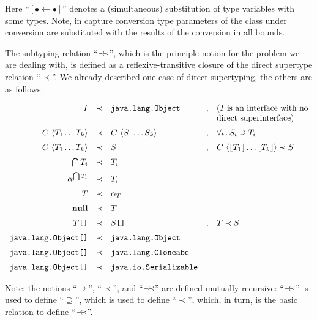 Here ``$[\bullet\gets\bullet]$'' denotes a (simultaneous) substitution of type variables with some types. Note, in capture conversion
type parameters of the class under conversion are substituted with the results of the conversion in all bounds.

The subtyping relation ``$\prec\mathrel{\mkern-5mu}\prec$'', which is the principle notion for the problem we are dealing with, is defined as a reflexive-transitive
closure of the direct supertype relation ``$\prec$''. We already described one case of direct supertyping, the others are as follows:

\[
\begin{array}{rclcl}
  I & \prec & \texttt{java.lang.Object} &,& \mbox{($I$ is an interface with no}\\
    &       &                         & &\mbox{direct superinterface)}\\[2mm]
  {C}\,\left<{T_1\dots T_k}\right> & \prec & {C}\,\left<{S_1\dots S_k}\right> &,& \forall i\, .\, S_i\supseteq T_i\\[2mm]
  {C}\,\left<{T_1\dots T_k}\right> & \prec & S &,& {C}\,\left<{\lfloor{T_1}\rfloor\dots \lfloor{T_k}\rfloor}\right>\prec S\\[2mm]
  \bigcap T_i & \prec & T_i && \\[2mm]
  \alpha^{\bigcap T_i} & \prec & T_i &&\\[2mm]
  T & \prec & \alpha_T && \\[2mm]
  \mathbf{null} & \prec & T &&\\[2mm]
  T\texttt{[]} & \prec & S\texttt{[]} &,& T\prec S\\[2mm]
  \texttt{java.lang.Object[]} & \prec & \texttt{java.lang.Object} &&  \\[2mm]
  \texttt{java.lang.Object[]} & \prec & \texttt{java.lang.Cloneabe} && \\[2mm]
  \texttt{java.lang.Object[]} & \prec & \texttt{java.io.Serializable} &&
\end{array}
\]

Note: the notions ``$\supseteq$'', ``$\prec$'', and ``$\prec\mathrel{\mkern-5mu}\prec$'' are defined mutually recursive: ``$\prec\mathrel{\mkern-5mu}\prec$'' is used
to define ``$\supseteq$'', which is used to define ``$\prec$'', which, in turn, is the basic relation to define ``$\prec\mathrel{\mkern-5mu}\prec$''.
